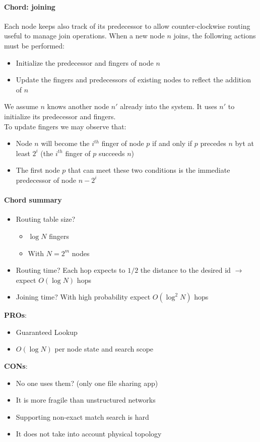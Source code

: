 \documentclass[10pt,a4paper]{article}
\begin{document}
\paragraph{Chord: joining}
Each node keeps also track of its predecessor to allow counter-clockwise routing useful to manage join operations. When a new node $n$ joins, the following actions must be performed:
\begin{itemize}
	\item Initialize the predecessor and fingers of node $n$
	\item Update the fingers and predecessors of existing nodes to reflect the addition of $n$
\end{itemize}
We assume $n$ knows another node $n'$ already into the system. It uses $n'$ to initialize its predecessor and fingers. \\ To update fingers we may observe that:
\begin{itemize}
	\item Node $n$ will become the $i^{th}$ finger of node $p$ if and only if $p$ precedes $n$ byt at least $2^i$ (the $i^{th}$ finger of $p$ succeeds $n$)
	\item The first node $p$ that can meet these two conditions is the immediate predecessor of node $n-2^i$
\end{itemize}
\paragraph{Chord summary}
\begin{itemize}
	\item Routing table size?
	\begin{itemize}
		\item $\log{N}$ fingers
		\item With $N=2^m$ nodes
	\end{itemize}
	\item Routing time? Each hop expects to $1/2$ the distance to the desired id $\rightarrow$ expect $O(\log{N})$ hops
	\item Joining time? With high probability expect $O(\log^2{N})$ hops
\end{itemize}
\pagebreak
\textbf{PROs}:
\begin{itemize}
	\item Guaranteed Lookup
	\item $O(\log{N})$ per node state and search scope
\end{itemize}
\textbf{CONs}:
\begin{itemize}
	\item No one uses them? (only one file sharing app)
	\item It is more fragile than unstructured networks
	\item Supporting non-exact match search is hard
	\item It does not take into account physical topology
\end{itemize}
\pagebreak
\end{document}

